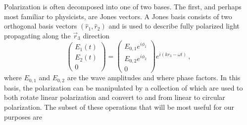 Polarization is often decomposed into one of two bases. The first, and perhaps most familiar to physicists, are Jones vectors. A Jones basis consists of two orthogonal basis vectors $(\hat{r}_{1}, \hat{r}_{2})$ and is used to describe fully polarized light propagating along the $\vec{r}_{3}$ direction
\begin{equation}
    \begin{pmatrix}
    E_{1}(t) \\
    E_{2}(t) \\
    0
    \end{pmatrix}
    =
    \begin{pmatrix}
    E_{0, 1} e^{i \phi_{1}} \\
    E_{0, 2} e^{i \phi_{2}} \\
    0
    \end{pmatrix}
    e^{i ( k r_{3} - \omega t)}\, ,
    \label{eq:jones_matrix_definition}
\end{equation}
where $E_{0, 1}$ and $E_{0, 2}$ are the wave amplitudes and where phase factors. In this basis, the polarization can be manipulated by a collection of  which are used to both rotate linear polarization and convert to and from linear to circular polarization. The subset of these operations that will be most useful for our purposes are
